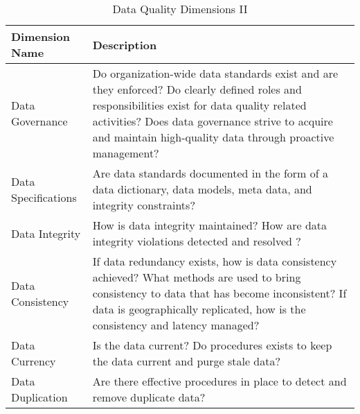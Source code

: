 \begin{table}
\caption{Data Quality Dimensions II}
\centering
\begin{tabular}{p{4.0cm} p{10cm}}
\toprule
\textbf{Dimension Name} & \textbf{Description} \\ 
\bottomrule
Data Governance & 
Do organization-wide data standards exist and are they enforced? Do clearly
defined roles and responsibilities exist for data quality related activities? Does
data governance strive to acquire and maintain high-quality data through proactive
management? \\

Data Specifications &
Are data standards documented in the form of a data dictionary, 
data models, meta data, and integrity constraints?  
\\

Data Integrity & 
How is data integrity maintained? How are data integrity violations detected and
resolved ?   
\\

Data Consistency & 
If data redundancy exists, how is data consistency achieved? What methods
are used to bring consistency to data that has become inconsistent? If data is
geographically replicated, how is the consistency and latency managed? 
\\

Data Currency & 
Is the data current? Do procedures exists to keep the data current and purge stale
data? 
\\

Data Duplication & Are there effective procedures in place to detect and remove duplicate data? 
\\


\end{tabular}
\end{table}
